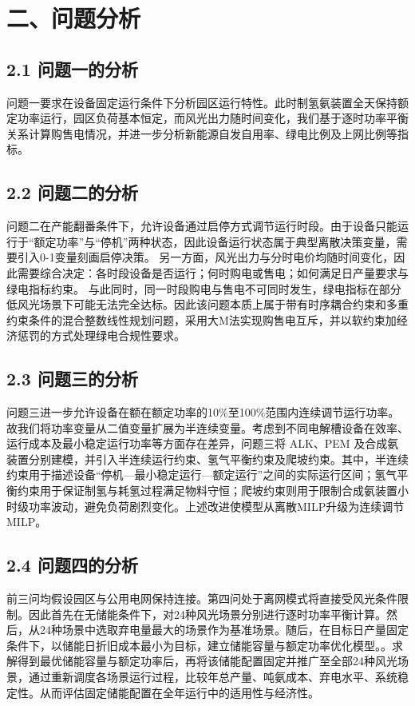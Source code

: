 \documentclass[zihao=-4,a4paper]{ctexart} %
\begin{document}
	\section*{二、问题分析}
	\subsection*{2.1 问题一的分析}
	
	问题一要求在设备固定运行条件下分析园区运行特性。此时制氢氨装置全天保持额定功率运行，园区负荷基本恒定，而风光出力随时间变化，我们基于逐时功率平衡关系计算购售电情况，并进一步分析新能源自发自用率、绿电比例及上网比例等指标。
	
	\subsection*{2.2 问题二的分析}
	
	问题二在产能翻番条件下，允许设备通过启停方式调节运行时段。由于设备只能运行于“额定功率”与“停机”两种状态，因此设备运行状态属于典型离散决策变量，需要引入0-1变量刻画启停决策。
	另一方面，风光出力与分时电价均随时间变化，因此需要综合决定：各时段设备是否运行；何时购电或售电；如何满足日产量要求与绿电指标约束。
	与此同时，同一时段购电与售电不可同时发生，绿电指标在部分低风光场景下可能无法完全达标。因此该问题本质上属于带有时序耦合约束和多重约束条件的混合整数线性规划问题，采用大M法实现购售电互斥，并以软约束加经济惩罚的方式处理绿电合规性要求。
	
	\subsection*{2.3 问题三的分析}
	
	问题三进一步允许设备在额在额定功率的10\%至100\%范围内连续调节运行功率。故我们将功率变量从二值变量扩展为半连续变量。考虑到不同电解槽设备在效率、运行成本及最小稳定运行功率等方面存在差异，问题三将 ALK、PEM 及合成氨装置分别建模，并引入半连续运行约束、氢气平衡约束及爬坡约束。其中，半连续约束用于描述设备“停机—最小稳定运行—额定运行”之间的实际运行区间；氢气平衡约束用于保证制氢与耗氢过程满足物料守恒；爬坡约束则用于限制合成氨装置小时级功率波动，避免负荷剧烈变化。上述改进使模型从离散MILP升级为连续调节MILP。
	
	\subsection*{2.4 问题四的分析}
	
	前三问均假设园区与公用电网保持连接。第四问处于离网模式将直接受风光条件限制。因此首先在无储能条件下，对24种风光场景分别进行逐时功率平衡计算。然后，从24种场景中选取弃电量最大的场景作为基准场景。随后，在目标日产量固定条件下，以储能日折旧成本最小为目标，建立储能容量与额定功率优化模型。。求解得到最优储能容量与额定功率后，再将该储能配置固定并推广至全部24种风光场景，通过重新调度各场景运行过程，比较年总产量、吨氨成本、弃电水平、系统稳定性。从而评估固定储能配置在全年运行中的适用性与经济性。
	
\end{document}
